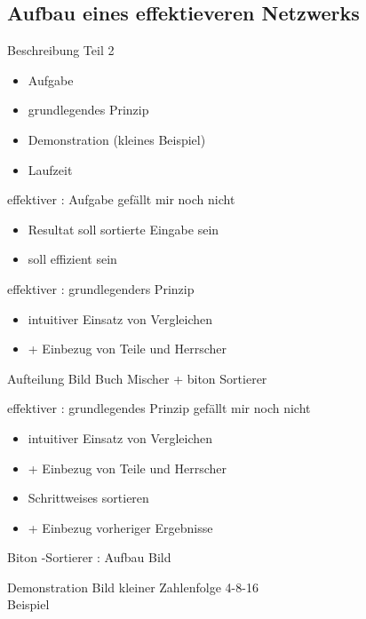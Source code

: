 \documentclass[ucs,9pt]{beamer}
\begin{document}
\subsection*{Aufbau eines effektieveren Netzwerks}
\begin{frame}{Beschreibung Teil 2}
\begin{itemize}
\item Aufgabe
\item grundlegendes Prinzip
\item Demonstration (kleines Beispiel)
\item Laufzeit
\end{itemize}
\end{frame}
\begin{frame}{effektiver : Aufgabe}
{\color{red}gefällt mir noch nicht}
\begin{itemize}
\item Resultat soll sortierte Eingabe sein
\item \alert{soll effizient sein}
\end{itemize}
\end{frame}
\begin{frame}{effektiver : grundlegenders Prinzip}
\begin{itemize}
\item intuitiver Einsatz von Vergleichen
\item[]\alert{+ Einbezug von Teile und Herrscher}
\end{itemize}
\end{frame}
\begin{frame}{Aufteilung}
Bild Buch Mischer + biton Sortierer
\end{frame}
\begin{frame}{effektiver : grundlegendes Prinzip}
{\color{red}gefällt mir noch nicht}
\begin{itemize}
\item intuitiver Einsatz von Vergleichen
\item[]\alert{+ Einbezug von Teile und Herrscher}
\item Schrittweises sortieren 
\item[]\alert{+ Einbezug vorheriger Ergebnisse}
\end{itemize}
\end{frame}
\begin{frame}{Biton -Sortierer : Aufbau}
Bild
\end{frame}
\begin{frame}{Demonstration}
Bild kleiner Zahlenfolge 4-8-16\\
Beispiel
\end{frame}
\end{document}
